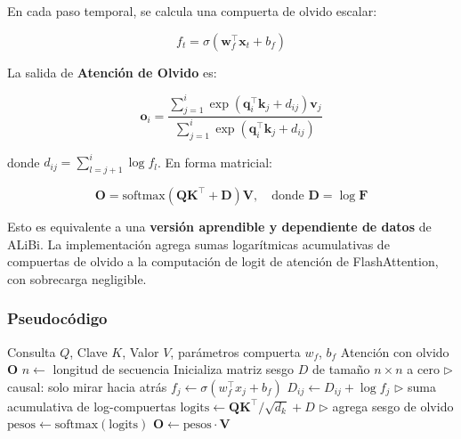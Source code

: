 \documentclass[11pt,a4paper]{article}
\begin{document}
En cada paso temporal, se calcula una compuerta de olvido escalar:

\begin{equation}
f_t = \sigma(\mathbf{w}_f^\top \mathbf{x}_t + b_f)
\end{equation}

La salida de \textbf{Atención de Olvido} es:

\begin{equation}
\mathbf{o}_i = \frac{\sum_{j=1}^{i} \exp(\mathbf{q}_i^\top \mathbf{k}_j + d_{ij}) \mathbf{v}_j}{\sum_{j=1}^{i} \exp(\mathbf{q}_i^\top \mathbf{k}_j + d_{ij})}
\end{equation}

donde $d_{ij} = \sum_{l=j+1}^{i} \log f_l$. En forma matricial:

\begin{equation}
\mathbf{O} = \text{softmax}(\mathbf{Q}\mathbf{K}^\top + \mathbf{D}) \mathbf{V}, \quad \text{donde } \mathbf{D} = \log \mathbf{F}
\end{equation}

Esto es equivalente a una \textbf{versión aprendible y dependiente de datos} de ALiBi. La implementación agrega sumas logarítmicas acumulativas de compuertas de olvido a la computación de logit de atención de FlashAttention, con sobrecarga negligible.

\subsubsection{Pseudocódigo}

\begin{algorithm}
\caption{FoX - Transformador de Olvido con Sesgo de Logit}
\begin{algorithmic}[1]
\Require Consulta $Q$, Clave $K$, Valor $V$, parámetros compuerta $w_f$, $b_f$
\Ensure Atención con olvido $\mathbf{O}$
\State $n \gets$ longitud de secuencia
\State Inicializa matriz sesgo $D$ de tamaño $n \times n$ a cero
      \quad $\triangleright$ causal: solo mirar hacia atrás
        \State $f_j \gets \sigma(w_f^\top x_j + b_f)$
        \State $D_{ij} \gets D_{ij} + \log f_j$ \quad $\triangleright$ suma acumulativa de log-compuertas
    \EndFor
\EndFor
\State $\text{logits} \gets \mathbf{Q} \mathbf{K}^\top / \sqrt{d_k} + D$ \quad $\triangleright$ agrega sesgo de olvido
\State $\text{pesos} \gets \text{softmax}(\text{logits})$
\State $\mathbf{O} \gets \text{pesos} \cdot \mathbf{V}$
\end{algorithmic}
\end{algorithm}
\end{document}
